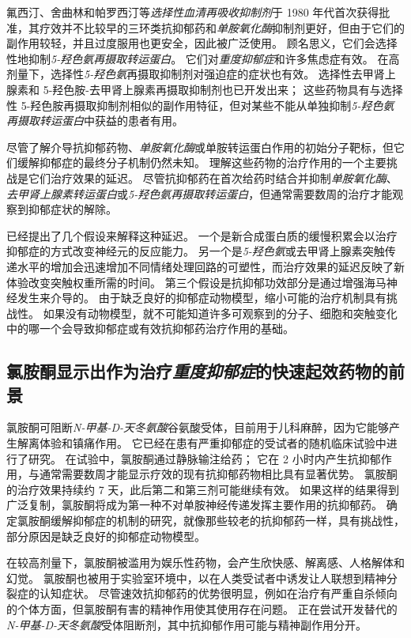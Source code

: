 氟西汀、舍曲林和帕罗西汀等\textit{选择性血清再吸收抑制剂}于 1980 年代首次获得批准，其疗效并不比较早的三环类抗抑郁药和\textit{单胺氧化酶}抑制剂更好，但由于它们的副作用较轻，并且过度服用也更安全，因此被广泛使用。
顾名思义，它们会选择性地抑制\textit{5-羟色氨再摄取转运蛋白}。
它们对\textit{重度抑郁症}和许多焦虑症有效。
在高剂量下，选择性\textit{5-羟色氨}再摄取抑制剂对强迫症的症状也有效。
选择性去甲肾上腺素和 5-羟色胺-去甲肾上腺素再摄取抑制剂也已开发出来；
这些药物具有与选择性 5-羟色胺再摄取抑制剂相似的副作用特征，但对某些不能从单独抑制\textit{5-羟色氨再摄取转运蛋白}中获益的患者有用。


尽管了解介导抗抑郁药物、\textit{单胺氧化酶}或单胺转运蛋白作用的初始分子靶标，但它们缓解抑郁症的最终分子机制仍然未知。
理解这些药物的治疗作用的一个主要挑战是它们治疗效果的延迟。
尽管抗抑郁药在首次给药时结合并抑制\textit{单胺氧化酶}、\textit{去甲肾上腺素转运蛋白}或\textit{5-羟色氨再摄取转运蛋白}，但通常需要数周的治疗才能观察到抑郁症状的解除。


已经提出了几个假设来解释这种延迟。
一个是新合成蛋白质的缓慢积累会以治疗抑郁症的方式改变神经元的反应能力。
另一个是\textit{5-羟色氨}或去甲肾上腺素突触传递水平的增加会迅速增加不同情绪处理回路的可塑性，而治疗效果的延迟反映了新体验改变突触权重所需的时间。
第三个假设是抗抑郁功效部分是通过增强海马神经发生来介导的。
由于缺乏良好的抑郁症动物模型，缩小可能的治疗机制具有挑战性。
如果没有动物模型，就不可能知道许多可观察到的分子、细胞和突触变化中的哪一个会导致抑郁症或有效抗抑郁药治疗作用的基础。



\subsection{氯胺酮显示出作为治疗\textit{重度抑郁症}的快速起效药物的前景}

氯胺酮可阻断\textit{N-甲基-D-天冬氨酸}谷氨酸受体，目前用于儿科麻醉，因为它能够产生解离体验和镇痛作用。
它已经在患有严重抑郁症的受试者的随机临床试验中进行了研究。
在试验中，氯胺酮通过静脉输注给药；
它在 2 小时内产生抗抑郁作用，与通常需要数周才能显示疗效的现有抗抑郁药物相比具有显著优势。
氯胺酮的治疗效果持续约 7 天，此后第二和第三剂可能继续有效。
如果这样的结果得到广泛复制，氯胺酮将成为第一种不对单胺神经传递发挥主要作用的抗抑郁药。
确定氯胺酮缓解抑郁症的机制的研究，就像那些较老的抗抑郁药一样，具有挑战性，部分原因是缺乏良好的抑郁症动物模型。


在较高剂量下，氯胺酮被滥用为娱乐性药物，会产生欣快感、解离感、人格解体和幻觉。
氯胺酮也被用于实验室环境中，以在人类受试者中诱发让人联想到精神分裂症的认知症状。
尽管速效抗抑郁药的优势很明显，例如在治疗有严重自杀倾向的个体方面，但氯胺酮有害的精神作用使其使用存在问题。
正在尝试开发替代的\textit{N-甲基-D-天冬氨酸}受体阻断剂，其中抗抑郁作用可能与精神副作用分开。



